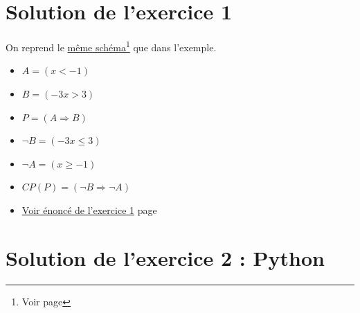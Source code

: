 \documentclass[a4paper,11pt]{book}
\begin{document}
\clearpage

\section{Solution de l'exercice 1}
\label{sec:orgacd1181}
\label{org51c56ef}
\label{page:sec8.1.1sol1}
On reprend le \hyperref[org084e38f]{même schéma}\footnote{Voir page \pageref{page:sec2.1.6cp}} que dans l'exemple.
\begin{itemize}
\item \(A = (x < -1)\)
\item \(B = (-3x > 3)\)
\item \(P = (A\Rightarrow B)\)
\item \(\neg B = (-3x \leq 3)\)
\item \(\neg A = (x \geq -1)\)
\item \(CP(P) = (\neg B\Rightarrow \neg A)\)
\end{itemize}


\begin{itemize}
\item \hyperref[orgfd91183]{Voir énoncé de l'exercice 1}
page~\pageref{page:sec2.1.7exo1}
\end{itemize}

\clearpage

\section{Solution de l'exercice 2 : Python}
\label{sec:org8f99e33}
\label{orged5d56d}
\label{page:sec8.1.2sol2}
\end{document}
